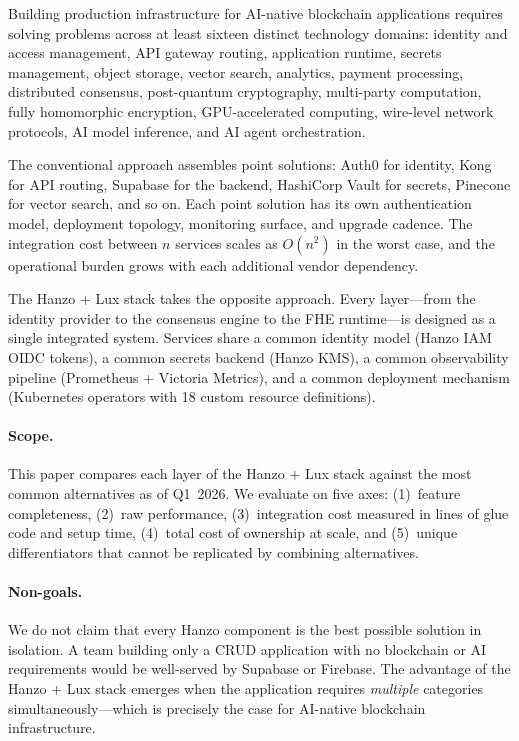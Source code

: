 \documentclass[11pt,twocolumn]{article}
\begin{document}
Building production infrastructure for AI-native blockchain applications requires solving problems across at least sixteen distinct technology domains: identity and access management, API gateway routing, application runtime, secrets management, object storage, vector search, analytics, payment processing, distributed consensus, post-quantum cryptography, multi-party computation, fully homomorphic encryption, GPU-accelerated computing, wire-level network protocols, AI model inference, and AI agent orchestration.

The conventional approach assembles point solutions: Auth0 for identity, Kong for API routing, Supabase for the backend, HashiCorp Vault for secrets, Pinecone for vector search, and so on. Each point solution has its own authentication model, deployment topology, monitoring surface, and upgrade cadence. The integration cost between $n$ services scales as $O(n^2)$ in the worst case, and the operational burden grows with each additional vendor dependency.

The Hanzo + Lux stack takes the opposite approach. Every layer---from the identity provider to the consensus engine to the FHE runtime---is designed as a single integrated system. Services share a common identity model (Hanzo IAM OIDC tokens), a common secrets backend (Hanzo KMS), a common observability pipeline (Prometheus + Victoria Metrics), and a common deployment mechanism (Kubernetes operators with 18 custom resource definitions).

\paragraph{Scope.} This paper compares each layer of the Hanzo + Lux stack against the most common alternatives as of Q1~2026. We evaluate on five axes: (1)~feature completeness, (2)~raw performance, (3)~integration cost measured in lines of glue code and setup time, (4)~total cost of ownership at scale, and (5)~unique differentiators that cannot be replicated by combining alternatives.

\paragraph{Non-goals.} We do not claim that every Hanzo component is the best possible solution in isolation. A team building only a CRUD application with no blockchain or AI requirements would be well-served by Supabase or Firebase. The advantage of the Hanzo + Lux stack emerges when the application requires \textit{multiple} categories simultaneously---which is precisely the case for AI-native blockchain infrastructure.
\end{document}
